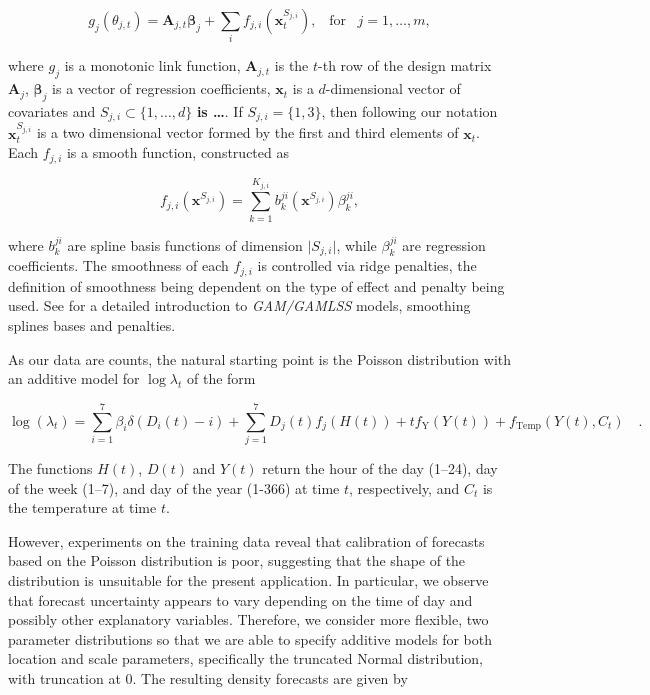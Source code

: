 \documentclass[]{elsarticle} %
\begin{document}
\begin{equation}
    g_j(\theta_{j,t})=\mathbf{A}_{j,t} \bm{\beta}_j + \sum_{i} f_{j,i}({\bm x}^{S_{j,i}}_t), \;\;\; \text{for} \;\;\; j = 1, \dots, m,
    \label{eq:basicGAM}
\end{equation}

where \(g_j\) is a monotonic link function, \(\mathbf{A}_{j,t}\) is the \(t\)-th row of the design matrix \(\mathbf{A}_j\), \(\bm \beta_j\) is a vector of regression coefficients, \(\bm x_t\) is a \(d\)-dimensional vector of covariates and \(S_{j,i} \subset \{1, \dots, d\}\) \textbf{is \ldots{}}. If \(S_{j,i} = \{1, 3\}\), then following our notation \({\bm x}_{t}^{S_{j,i}}\) is a two dimensional vector formed by the first and third elements of \(\bm x_t\). Each \(f_{j,i}\) is a smooth function, constructed as

\begin{equation}
    f_{j,i}(\bm x^{S_{j,i}}) = \sum_{k=1}^{K_{j,i}} b^{ji}_k (\bm x^{S_{j,i}}) \beta_k^{ji},
    \label{eq:smmothfunction}
\end{equation}

where \(b^{ji}_k\) are spline basis functions of dimension \(\vert S_{j,i} \vert\), while \(\beta_k^{ji}\) are regression coefficients. The smoothness of each \(f_{j,i}\) is controlled via ridge penalties, the definition of smoothness being dependent on the type of effect and penalty being used. See \citet{Wood2017} for a detailed introduction to \emph{GAM/GAMLSS} models, smoothing splines bases and penalties.

As our data are counts, the natural starting point is the Poisson distribution with an additive model for \(\log \lambda_t\) of the form

\begin{equation}
  \log(\lambda_t) = \sum_{i=1}^7 \beta_i \delta(D_i(t)-i) + \sum_{j=1}^7 D_j(t) f_j(H(t)) + t f_\text{Y}(Y(t)) + f_\text{Temp}(Y(t),C_t) \quad .
 \label{eq:additivemodel}
\end{equation}

The functions \(H(t)\), \(D(t)\) and \(Y(t)\) return the hour of the day (1--24), day of the week (1--7), and day of the year (1-366) at time \(t\), respectively, and \(C_t\) is the temperature at time \(t\).

However, experiments on the training data reveal that calibration of forecasts based on the Poisson distribution is poor, suggesting that the shape of the distribution is unsuitable for the present application. In particular, we observe that forecast uncertainty appears to vary depending on the time of day and possibly other explanatory variables. Therefore, we consider more flexible, two parameter distributions so that we are able to specify additive models for both location and scale parameters, specifically the truncated Normal distribution, with truncation at 0. The resulting density forecasts are given by
\end{document}
